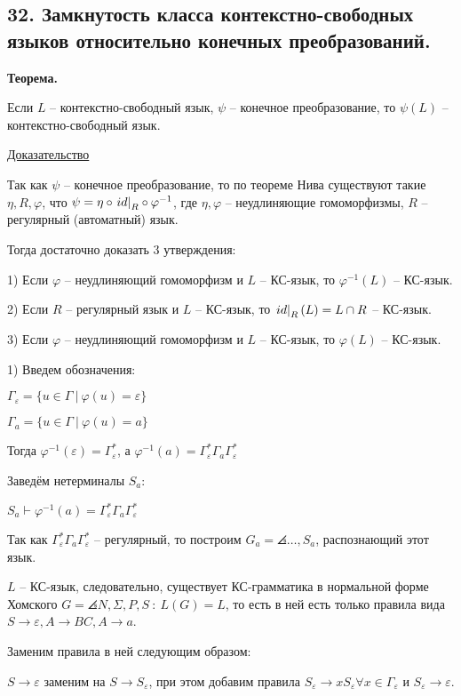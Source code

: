 \subsection{32. Замкнутость класса контекстно-свободных языков относительно конечных преобразований.}

\textbf{Теорема. }

Если $L$ -- контекстно-свободный язык, $\psi$ -- конечное преобразование, то
$\psi(L)$ -- контекстно-свободный язык.

\underline{Доказательство}

Так как $\psi$ -- конечное преобразование, то по теореме Нива
существуют такие $\eta, R, \varphi$, что 
$\psi = \eta \circ \left. id \right|_{R} \circ \varphi^{-1}$, 
где $\eta, \varphi$ -- неудлиняющие гомоморфизмы,
$R$ -- регулярный (автоматный) язык.

Тогда достаточно доказать 3 утверждения:

1) Если $\varphi$ -- неудлиняющий гомоморфизм и $L$ -- КС-язык, то $\varphi^{-1} (L)$ -- КС-язык.

2) Если $R$ -- регулярный язык и $L$ -- КС-язык, то $\left. id \right|_{R} (L) = L \cap R$ -- КС-язык.

3) Если $\varphi$ -- неудлиняющий гомоморфизм и $L$ -- КС-язык, то $\varphi (L)$ -- КС-язык.

1) Введем обозначения:

$\Gamma_{\varepsilon} = \{ u \in \Gamma \ |\ \varphi(u) = \varepsilon \}$

$\Gamma_a = \{ u \in \Gamma \ |\ \varphi(u) = a \}$

Тогда $\varphi^{-1}(\varepsilon) = \Gamma_{\varepsilon}^{*}$, а 
$\varphi^{-1}(a) = \Gamma_{\varepsilon}^{*} \Gamma_a \Gamma_{\varepsilon}^{*}$

Заведём нетерминалы $S_a$:

$S_a \vdash \varphi^{-1}(a) = \Gamma_{\varepsilon}^{*} \Gamma_a \Gamma_{\varepsilon}^{*}$

Так как $\Gamma_{\varepsilon}^{*} \Gamma_a \Gamma_{\varepsilon}^{*}$ -- регулярный, то построим $G_a = \angles{\ldots, S_a}$, распознающий этот язык.

$L$ -- КС-язык, следовательно, существует КС-грамматика в нормальной форме Хомского $G = \angles{N, \Sigma, P, S}\ :\ L(G) = L$, то есть в ней есть только правила вида $S \to \varepsilon, A \to BC, A \to a$.

Заменим правила в ней следующим образом:

$S \to \varepsilon$ заменим на $S \to S_{\varepsilon}$, при этом добавим правила $S_{\varepsilon} \to x S_{\varepsilon} \forall x \in \Gamma_{\varepsilon}$ и $S_{\varepsilon} \to \varepsilon$.


